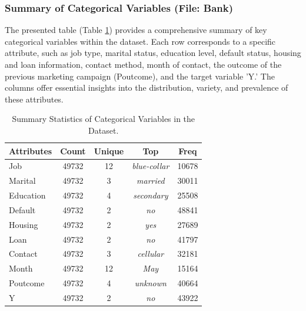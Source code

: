 \documentclass{article}
\begin{document}
            \subsubsection{Summary of Categorical Variables (File: Bank) }
            The presented table (Table \ref{tab:my_label}) provides a comprehensive summary of key categorical variables within the dataset. Each row corresponds to a specific attribute, such as job type, marital status, education level, default status, housing and loan information, contact method, month of contact, the outcome of the previous marketing campaign (Poutcome), and the target variable 'Y.' The columns offer essential insights into the distribution, variety, and prevalence of these attributes. 
            \begin{table}[h]
               \centering
               \begin{tabular}{lcccc}
                   \textbf{Attributes} & \textbf{Count} & \textbf{Unique} & \textbf{Top} & \textbf{Freq} \\
                   \hline
                   Job & 49732 & 12 & \textit{blue-collar} & 10678 \\ 
                   Marital & 49732 & 3 & \textit{married} & 30011 \\ 
                   Education & 49732 & 4 & \textit{secondary} & 25508 \\ 
                   Default & 49732 & 2 & \textit{no} & 48841 \\
                   Housing & 49732 & 2 & \textit{yes} & 27689 \\
                   Loan & 49732 & 2 & \textit{no} & 41797 \\
                   Contact & 49732 & 3 & \textit{cellular} & 32181 \\
                   Month & 49732 & 12 & \textit{May} & 15164 \\
                   Poutcome & 49732 & 4 & \textit{unknown} & 40664 \\
                   Y & 49732 & 2 & \textit{no }& 43922 \\
               \end{tabular}
               \caption{Summary Statistics of Categorical Variables in the Dataset.}
               \label{tab:my_label}
           \end{table}
           
\end{document}
